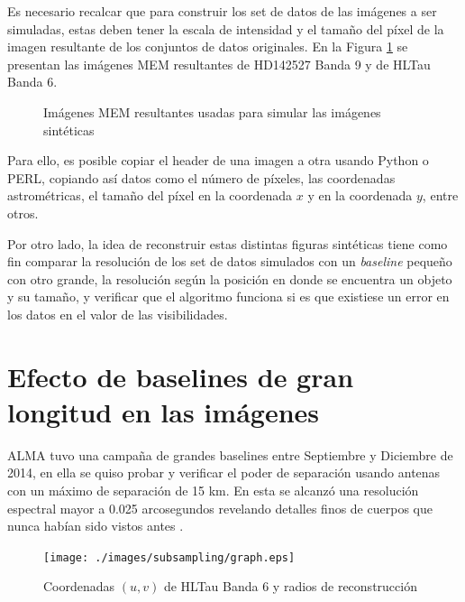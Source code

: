 Es necesario recalcar que para construir los set de datos de las imágenes a ser simuladas, estas deben tener la  escala de intensidad y el tamaño del píxel de la imagen resultante de los conjuntos de datos originales. En la Figura \ref{fig:result_simu} se presentan las imágenes MEM resultantes de HD142527 Banda 9 y de HLTau Banda 6.

\begin{figure}[h!]
\centering
{}\hspace*{0.0cm}
\label{fig:result_simu}
\caption{Imágenes MEM resultantes usadas para simular las imágenes sintéticas}
\end{figure}

Para ello, es posible copiar el header de una imagen a otra usando Python o PERL, copiando así datos como el número de píxeles, las coordenadas astrométricas, el tamaño del píxel en la coordenada $x$ y en la coordenada $y$, entre otros.

Por otro lado, la idea de reconstruir estas distintas figuras sintéticas tiene como fin comparar la resolución de los set de datos simulados con un \textit{baseline} pequeño con otro grande, la resolución según la posición en donde se encuentra un objeto y su tamaño, y verificar que el algoritmo funciona si es que existiese un error en los datos en el valor de las visibilidades.



\section{Efecto de baselines de gran longitud en las imágenes}

ALMA tuvo una campaña de grandes baselines entre Septiembre y Diciembre de 2014, en ella se quiso probar y verificar el poder de separación usando antenas con un máximo de separación de 15 km. En esta se alcanzó una resolución espectral mayor a 0.025 arcosegundos revelando detalles finos de cuerpos que nunca habían sido vistos antes \citep{longbaselines}.

\begin{figure}[h!]
\centering
\texttt{[image: ./images/subsampling/graph.eps]}
\caption{Coordenadas $(u,v)$ de HLTau Banda 6 y radios de reconstrucción}
\label{fig:uv_radios}
\end{figure}

